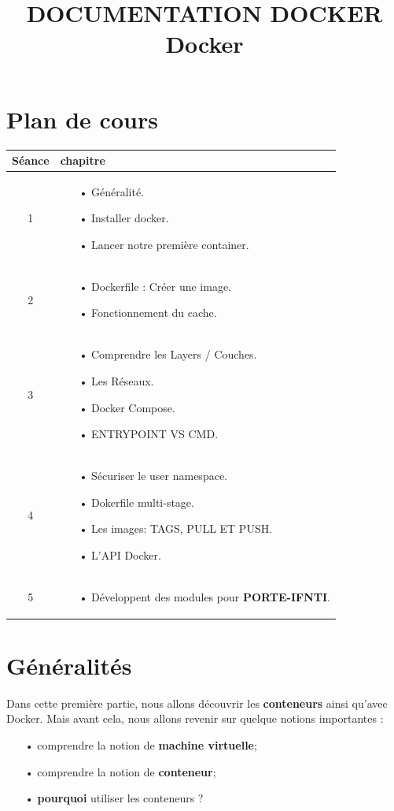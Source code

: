 \documentclass[12pt,a4paper]{article}
\title{DOCUMENTATION DOCKER \textbf{Docker}}
\begin{document}
\maketitle
\section{Plan de cours}

\begin{tabular}{|c|p{12cm}|}
\hline 
Séance & chapitre \\ 
\hline 
1 & \begin{itemize}
\item[•] Généralité.
\item[•] Installer docker.
\item[•] Lancer notre première container.
\end{itemize} \\ 
\hline 
2 & \begin{itemize}
\item[•] Dockerfile : Créer une image.
\item[•] Fonctionnement du cache.
\end{itemize} \\ 
\hline 
3 & \begin{itemize}
\item[•] Comprendre les Layers / Couches.
\item[•] Les Réseaux.
\item[•] Docker Compose.
\item[•] ENTRYPOINT VS CMD.
\end{itemize} \\ 
\hline 
4 & \begin{itemize}
\item[•] Sécuriser le user namespace.
\item[•] Dokerfile multi-stage.
\item[•] Les images: TAGS, PULL ET PUSH.
\item[•] L'API Docker.
\end{itemize} \\ 
\hline 
5 & \begin{itemize}
\item[•] Développent des modules pour \textbf{PORTE-IFNTI}.
\end{itemize} \\ 
\hline 
\end{tabular} 

\section{Généralités}
Dans cette première partie, nous allons découvrir les \textbf{conteneurs} ainsi qu'avec 
Docker. Mais avant cela, nous allons revenir sur quelque notions importantes :
\begin{itemize}
\item[•] comprendre la notion de \textbf{machine virtuelle};
\item[•] comprendre la notion de \textbf{conteneur};
\item[•] \textbf{pourquoi} utiliser les conteneurs ?
\end{itemize} 
\end{document}
